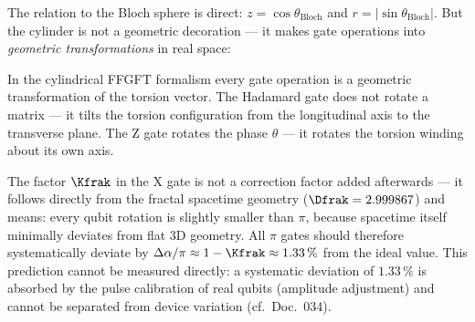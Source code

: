 The relation to the Bloch sphere is direct:
$z = \cos\theta_\text{Bloch}$ and $r = |\sin\theta_\text{Bloch}|$.
But the cylinder is not a geometric decoration ---
it makes gate operations into \emph{geometric
transformations} in real space:

\begin{center}
\end{center}

\begin{foundation}
In the cylindrical FFGFT formalism every gate operation
is a geometric transformation of the torsion vector.
The Hadamard gate does not rotate a matrix ---
it tilts the torsion configuration from the
longitudinal axis to the transverse plane.
The Z gate rotates the phase $\theta$ ---
it rotates the torsion winding about its own axis.

The factor $\Kfrak$ in the X gate is not
a correction factor added afterwards ---
it follows directly from the fractal spacetime geometry
($\Dfrak = 2.999867$) and means:
every qubit rotation is slightly smaller than $\pi$,
because spacetime itself minimally deviates from flat
3D geometry.
All $\pi$ gates should therefore systematically deviate by
$\Delta\alpha/\pi \approx 1 - \Kfrak \approx 1.33\,\%$ from the ideal value.
This prediction cannot be measured directly: a systematic deviation of $1.33\,\%$ is absorbed by the pulse calibration of real qubits (amplitude adjustment) and cannot be separated from device variation (cf.\ Doc.~034).
\end{foundation}

